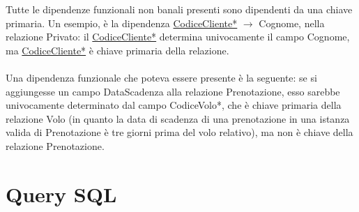 \documentclass[10pt]{article}
\begin{document}
Tutte le dipendenze funzionali non banali presenti sono dipendenti da una chiave primaria. Un esempio, è la dipendenza \underline{CodiceCliente*} $\longrightarrow$ Cognome, nella relazione Privato: il \underline{CodiceCliente*} determina univocamente il campo Cognome, ma \underline{CodiceCliente*} è chiave primaria della relazione.\\\\
Una dipendenza funzionale che poteva essere presente è la seguente: se si aggiungesse un campo DataScadenza alla relazione Prenotazione, esso sarebbe univocamente determinato dal campo CodiceVolo*, che è chiave primaria della relazione Volo (in quanto la data di scadenza di una prenotazione in una istanza valida di Prenotazione è tre giorni prima del volo relativo), ma non è chiave della relazione Prenotazione.
\pagebreak
\section{Query SQL}
\end{document}
